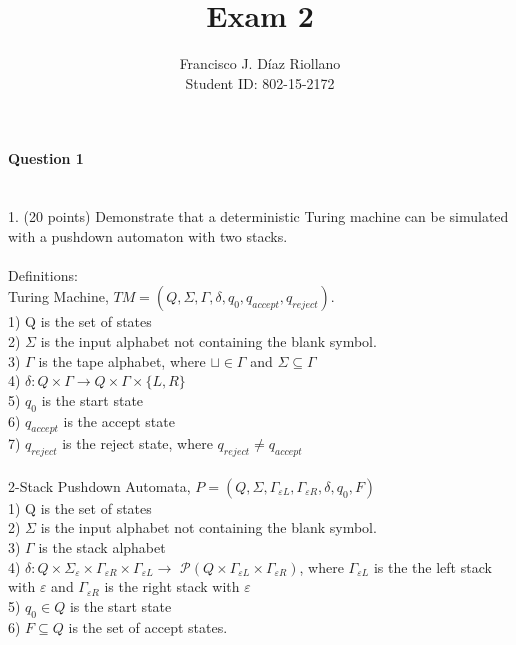 \documentclass{report}
\title{Exam 2}
\author{Francisco J. Díaz Riollano \\ Student ID: 802-15-2172 }
\newcommand{\me}[1]{
\begin{math}
#1
\end{math}
}
\begin{document}
\maketitle
\paragraph{\Large{Question 1\\ \\}}
1. (20 points) Demonstrate that a deterministic Turing machine can be simulated with a pushdown automaton with two stacks.  \\ \\
Definitions: \\
Turing Machine, \me{TM =(Q,\Sigma, \Gamma, \delta, q_0,q_{accept}, q_{reject}). } \\
1) Q is the set of states \\
2)\me{\Sigma} is the input alphabet not containing the blank symbol. \\
3) \me{\Gamma} is the tape alphabet, where $\sqcup \in \Gamma $ and $\Sigma \subseteq \Gamma$ \\
4) \me{\delta: Q \times \Gamma \to Q \times \Gamma \times  \{L,R\}}\\
5) $q_0$ is the start state\\
6) $q_{accept}$ is the accept state \\
7) $q_{reject}$ is the reject state, where $q_{reject} \neq q_{accept}$
\\ \\
2-Stack Pushdown Automata, \me{P =(Q,\Sigma, \Gamma_{\varepsilon L},\Gamma_{\varepsilon R}, \delta, q_0,F)} \\
1) Q is the set of states \\
2)\me{\Sigma} is the input alphabet not containing the blank symbol. \\
3) \me{\Gamma} is the stack alphabet \\
4) \me{\delta: Q \times \Sigma_{\varepsilon} \times \Gamma_{\varepsilon R} \times \Gamma_{\varepsilon L}  \to } $\mathcal{P}(Q \times \Gamma_{\varepsilon L}\times\Gamma_{\varepsilon R})$, where $\Gamma_{\varepsilon L} $ is the the left stack with    $\varepsilon$ and $\Gamma_{\varepsilon R}$ is the right stack with $\varepsilon$ \\
5) $q_0 \in Q$ is the start state\\
6) $F \subseteq Q$ is the set of accept states. \\ \\ 
\end{document}
